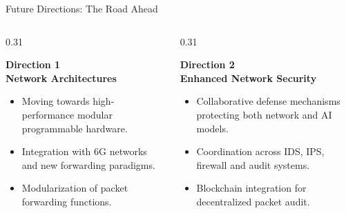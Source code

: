 {
\begin{frame}{Future Directions: The Road Ahead}


  \begin{columns}[T, totalwidth=\textwidth]

    \begin{column}{0.31\textwidth}
      \begin{tcolorbox}[problemcard=HUAblue]
        {\color{HUAblue}\bfseries\small
          Direction 1}\\[2pt]
        {\color{HUAblue}\bfseries\scriptsize
          Network Architectures}
        \vspace{4pt}
        \begin{itemize}
          \setlength\itemsep{3pt}
          \fontsize{7}{8}\selectfont\color{HUAdark}
          \item Moving towards high-performance
                modular programmable hardware.
          \item Integration with 6G networks
                and new forwarding paradigms.
          \item Modularization of packet
                forwarding functions.\newline
        \end{itemize}
      \end{tcolorbox}
    \end{column}

    \begin{column}{0.31\textwidth}
      \begin{tcolorbox}[problemcard=problemorange]
        {\color{problemorange}\bfseries\small
          Direction 2}\\[2pt]
        {\color{problemorange}\bfseries\scriptsize
          Enhanced Network Security}
        \vspace{4pt}
        \begin{itemize}
          \setlength\itemsep{3pt}
          \fontsize{7}{8}\selectfont\color{HUAdark}
          \item Collaborative defense mechanisms
                protecting both network and
                AI models.
          \item Coordination across IDS, IPS,
                firewall and audit systems.
          \item Blockchain integration for
                decentralized packet audit.
        \end{itemize}
      \end{tcolorbox}
    \end{column}


\end{columns}
\end{frame}}

